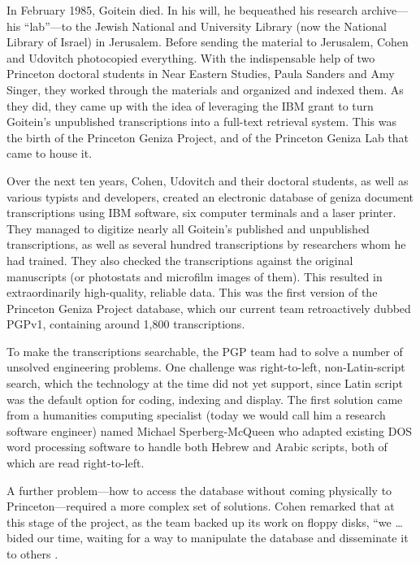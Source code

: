 \documentclass{article}
\begin{document}
In February 1985, Goitein died. In his will, he bequeathed his research archive—his “lab”—to the Jewish National and University Library (now the National Library of Israel) in Jerusalem. Before sending the material to Jerusalem, Cohen and Udovitch photocopied everything. With the indispensable help of two Princeton doctoral students in Near Eastern Studies, Paula Sanders and Amy Singer, they worked through the materials and organized and indexed them. As they did, they came up with the idea of leveraging the IBM grant to turn Goitein’s unpublished transcriptions into a full-text retrieval system. This was the birth of the Princeton Geniza Project, and of the Princeton Geniza Lab that came to house it.

Over the next ten years, Cohen, Udovitch and their doctoral students, as well as various typists and developers, created an electronic database of geniza document transcriptions using IBM software, six computer terminals and a laser printer. They managed to digitize nearly all Goitein’s published and unpublished transcriptions, as well as several hundred transcriptions by researchers whom he had trained. They also checked the transcriptions against the original manuscripts (or photostats and microfilm images of them). This resulted in extraordinarily high-quality, reliable data. This was the first version of the Princeton Geniza Project database, which our current team retroactively dubbed PGPv1, containing around 1,800 transcriptions.

To make the transcriptions searchable, the PGP team had to solve a number of unsolved engineering problems. One challenge was right-to-left, non-Latin-script search, which the technology at the time did not yet support, since Latin script was the default option for coding, indexing and display. The first solution came from a humanities computing specialist (today we would call him a research software engineer) named Michael Sperberg-McQueen who adapted existing DOS word processing software to handle both Hebrew and Arabic scripts, both of which are read right-to-left. 

A further problem—how to access the database without coming physically to Princeton—required a more complex set of solutions. Cohen remarked that at this stage of the project, as the team backed up its work on floppy disks, “we … bided our time, waiting for a way to manipulate the database and disseminate it to others \autocite[40]{cohen_princeton_2014}.
\end{document}
